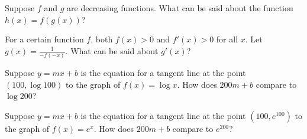 \documentclass{ximera}
\newcommand{\recommendation}[1]{}
\begin{document}
\begin{shuffle}
\begin{problem}
  Suppose $f$ and $g$ are decreasing functions.  What can be said about the function $h(x) = f(g(x))$?
  \begin{multipleChoice}
  \end{multipleChoice}
\end{problem}

\begin{problem}
  For a certain function $f$, both $f(x) > 0$ and $f'(x) > 0$ for all $x$.  Let $g(x) = \frac{1}{-f(-x)}$.  What can be said about $g'(x)$?
  \begin{multipleChoice}
  \end{multipleChoice}
\end{problem}



\begin{problem}
  Suppose $y = mx + b$ is the equation for a tangent line at the point $(100,\log 100)$ to the graph of $f(x) = \log x$.  How does $200m + b$ compare to $\log 200$?
  \begin{multipleChoice}
  \end{multipleChoice}
\end{problem}

\begin{problem}
  Suppose $y = mx + b$ is the equation for a tangent line at the point $(100,e^{100})$ to the graph of $f(x) = e^x$.  How does $200m + b$ compare to $e^{200}$?
  \begin{multipleChoice}
  \end{multipleChoice}
\end{problem}


\end{shuffle}
\end{document}
